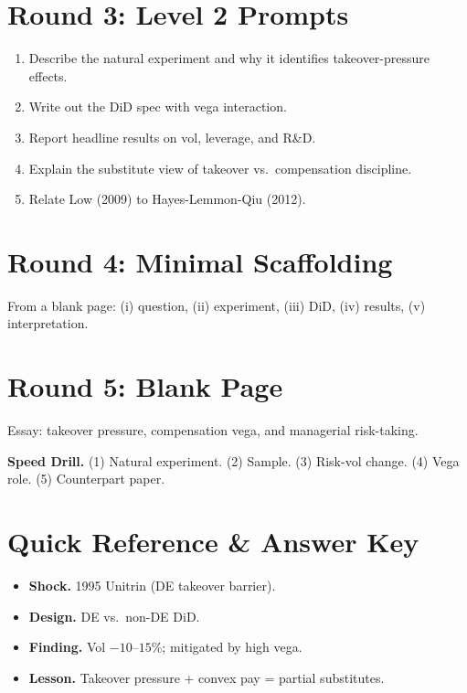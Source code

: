\documentclass[11pt]{article}
\begin{document}
\section*{Round 3: Level 2 Prompts}
\begin{enumerate}
\item Describe the natural experiment and why it identifies takeover-pressure effects.
\item Write out the DiD spec with vega interaction.
\item Report headline results on vol, leverage, and R\&D.
\item Explain the substitute view of takeover vs.\ compensation discipline.
\item Relate Low (2009) to Hayes-Lemmon-Qiu (2012).
\end{enumerate}

\section*{Round 4: Minimal Scaffolding}
From a blank page: (i) question, (ii) experiment, (iii) DiD, (iv) results, (v) interpretation.

\section*{Round 5: Blank Page}
Essay: takeover pressure, compensation vega, and managerial risk-taking.

\vspace{6pt}
\begin{drillbox}
\textbf{Speed Drill.} (1) Natural experiment. (2) Sample. (3) Risk-vol change. (4) Vega role. (5) Counterpart paper.
\end{drillbox}

\section*{Quick Reference \& Answer Key}
\begin{answerbox}
\begin{itemize}
\item \textbf{Shock.} 1995 Unitrin (DE takeover barrier).
\item \textbf{Design.} DE vs.\ non-DE DiD.
\item \textbf{Finding.} Vol $-10$--$15$\%; mitigated by high vega.
\item \textbf{Lesson.} Takeover pressure + convex pay = partial substitutes.
\end{itemize}
\end{answerbox}
\end{document}
